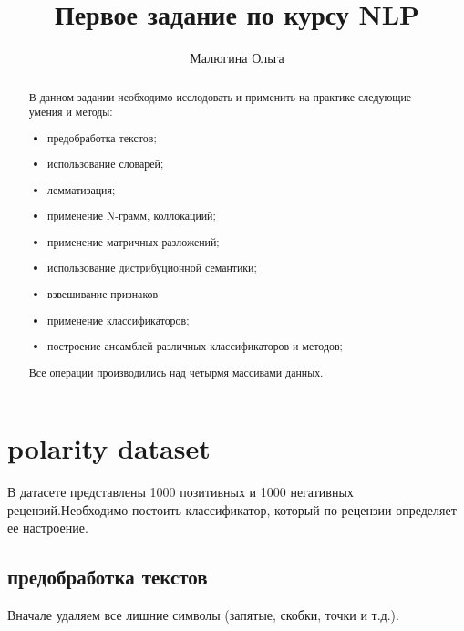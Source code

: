 \documentclass[]{report}
\title{Первое задание по курсу NLP}
\author{Малюгина Ольга}
\begin{document}
\maketitle

\begin{abstract}
	В данном задании необходимо исслодовать и применить на практике следующие умения и методы:
	\begin{itemize}
		\item предобработка текстов;
		\item использование словарей;
		\item лемматизация;
		\item применение N-грамм, коллокациий;
		\item применение матричных разложений;
		\item использование дистрибуционной семантики;
		\item взвешивание признаков
		\item применение классификаторов;
		\item построение ансамблей различных классификаторов и методов;		
	\end{itemize}
	Все операции производились над четырмя массивами данных.
\end{abstract}

\section{polarity dataset}
В датасете представлены 1000 позитивных и 1000 негативных рецензий.Необходимо постоить классификатор, который по рецензии определяет ее настроение.
\subsection{предобработка текстов}
Вначале удаляем все лишние символы (запятые, скобки, точки и т.д.).
\end{document}
